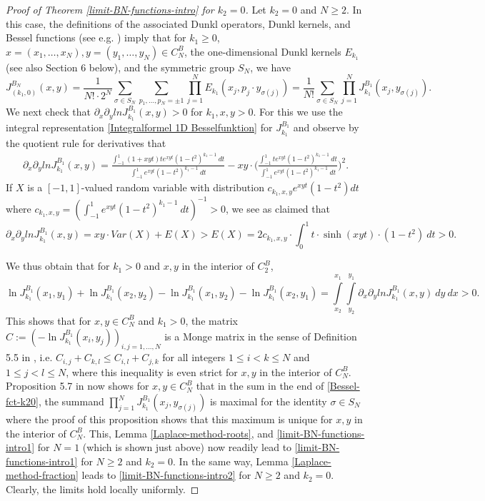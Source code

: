 \documentclass[reqno]{amsart}
\theoremstyle{plain}
\theoremstyle{definition}
\numberwithin{equation}{section}
\begin{document}
\begin{proof}[Proof of Theorem \ref{limit-BN-functions-intro} for $k_2=0$]
 
Let $k_2=0$ and $N\ge2$. In this case,
the definitions of the associated Dunkl operators, Dunkl kernels, and Bessel functions (see e.g. \cite{D,R3}) imply that
for  $k_1\ge0$, $x=(x_1,\ldots,x_N),y=(y_1,\ldots,y_N)\in C_N^B$, the one-dimensional  Dunkl kernels $E_{k_1}$ (see also Section 6 below),
and the symmetric group $S_N$, we have
\begin{equation}\label{Bessel-fct-k20}
  J^{B_N}_{(k_1,0)}(x,y)= \frac{1}{N! \cdot 2^N}\sum_{\sigma\in S_N}\sum_{p_1,\ldots,p_N=\pm 1}\prod_{j=1}^N E_{k_1}(x_j, p_j\cdot y_{\sigma(j)})
  =\frac{1}{N!}\sum_{\sigma\in S_N} \prod_{j=1}^N  J^{B_1}_{k_1}(x_j,  y_{\sigma(j)}).
\end{equation}
We next check that $\partial_x \partial_y ln J^{B_1}_{k_1}(x,y)>0$ for $k_1,x,y > 0$. For this we use
the integral representation \eqref{Integralformel 1D Besselfunktion} for $J_{k_1}^{B_1}$ and
observe by the quotient rule for derivatives that
\begin{align*}
  \partial_x \partial_y ln J^{B_1}_{k_1}(x,y)
  = \frac{\int_{-1}^1 (1+xyt)te^{xyt}(1-t^2)^{k_1-1}\> dt}{\int_{-1}^1 e^{xyt}(1-t^2)^{k_1-1}\> dt} -
  xy \cdot \Bigg( \frac{ \int_{-1}^1 te^{xyt}(1-t^2)^{k_1-1}\> dt}{\int_{-1}^1 e^{xyt}(1-t^2)^{k_1-1}\> dt}\Bigg)^2.
\end{align*}
If $X$ is a $[-1,1]$-valued random variable with distribution $c_{k_1,x,y}e^{xyt}(1-t^2)dt$
where $c_{k_1,x,y}=(\int_{-1}^1 e^{xyt}(1-t^2)^{k_1-1}\> dt)^{-1}>0$, we see as claimed that 
$$\partial_x \partial_y ln J^{B_1}_{k_1}(x,y)=xy \cdot Var(X)+E(X) > E(X)=2c_{k_1,x,y} \cdot \int_0^1 t \cdot \sinh(xyt) \cdot (1-t^2) \> dt >0.$$


We thus obtain that for $k_1>0$ and  $x,y$ in the interior of $C_2^B$,
$$\ln J^{B_1}_{k_1}(x_1,y_1)+\ln J^{B_1}_{k_1}(x_2,y_2)-\ln J^{B_1}_{k_1}(x_1,y_2)-\ln J^{B_1}_{k_1}(x_2,y_1)
= \int\limits_{x_2}^{x_1} \int\limits_{y_2}^{y_1} \partial_x \partial_y ln J^{B_1}_{k_1}(x,y)\>dy \> dx>0.$$
This shows that for $x,y \in C_N^B$ and $k_1 > 0$, the matrix $C:=(-\ln J^{B_1}_{k_1}(x_i,y_j))_{i,j=1,\ldots,N}$ is a Monge matrix
in the sense of Definition 5.5 in \cite{BDM},
i.e. $C_{i,j} + C_{k,l} \leq C_{i,l} + C_{j,k}$ for all integers $1 \leq i < k \leq N$ and $1 \leq j < l \leq N$,
where this inequality is even strict  for $x,y$ in the interior of $C_N^B$.
Proposition 5.7 in \cite{BDM} now shows  for $x,y \in C_N^B$ that in the sum in the end of \eqref{Bessel-fct-k20}, the summand
$\prod_{j=1}^N  J^{B_1}_{k_1}(x_j,  y_{\sigma(j)})$ is maximal for the identity $\sigma\in S_N$
where the proof  of this proposition shows that this maximum is unique for $x,y$ in the interior of $C_N^B$.
This, Lemma \ref{Laplace-method-roots}, and
  \eqref{limit-BN-functions-intro1} for $N=1$ (which is shown just above)
  now readily lead to \eqref{limit-BN-functions-intro1} for $N\ge2$ and $k_2=0$.
In the same way, Lemma  \ref{Laplace-method-fraction} leads to \eqref{limit-BN-functions-intro2} for $N\ge2$ and $k_2=0$.
Clearly, the limits hold locally uniformly.
\end{proof}
\end{document}
